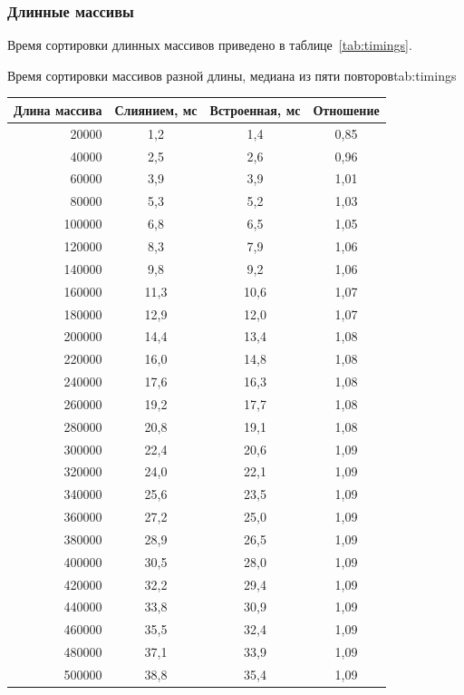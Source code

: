 \documentclass{mtuci-report}
\begin{document}
\subsubsection{Длинные массивы}
Время сортировки длинных массивов приведено в таблице~\ref{tab:timings}.
\begin{bbttable}{Время сортировки массивов разной длины, медиана из пяти
  повторов}{tab:timings}
  \begin{tabular}{|r|c|c|c|}
    \hline
    Длина массива & Слиянием, мс & Встроенная, мс & Отношение \\ \hline
    20000 & 1,2 & 1,4 & 0,85 \\ \hline
    40000 & 2,5 & 2,6 & 0,96 \\ \hline
    60000 & 3,9 & 3,9 & 1,01 \\ \hline
    80000 & 5,3 & 5,2 & 1,03 \\ \hline
    100000 & 6,8 & 6,5 & 1,05 \\ \hline
    120000 & 8,3 & 7,9 & 1,06 \\ \hline
    140000 & 9,8 & 9,2 & 1,06 \\ \hline
    160000 & 11,3 & 10,6 & 1,07 \\ \hline
    180000 & 12,9 & 12,0 & 1,07 \\ \hline
    200000 & 14,4 & 13,4 & 1,08 \\ \hline
    220000 & 16,0 & 14,8 & 1,08 \\ \hline
    240000 & 17,6 & 16,3 & 1,08 \\ \hline
    260000 & 19,2 & 17,7 & 1,08 \\ \hline
    280000 & 20,8 & 19,1 & 1,08 \\ \hline
    300000 & 22,4 & 20,6 & 1,09 \\ \hline
    320000 & 24,0 & 22,1 & 1,09 \\ \hline
    340000 & 25,6 & 23,5 & 1,09 \\ \hline
    360000 & 27,2 & 25,0 & 1,09 \\ \hline
    380000 & 28,9 & 26,5 & 1,09 \\ \hline
    400000 & 30,5 & 28,0 & 1,09 \\ \hline
    420000 & 32,2 & 29,4 & 1,09 \\ \hline
    440000 & 33,8 & 30,9 & 1,09 \\ \hline
    460000 & 35,5 & 32,4 & 1,09 \\ \hline
    480000 & 37,1 & 33,9 & 1,09 \\ \hline
    500000 & 38,8 & 35,4 & 1,09 \\ \hline

\end{tabular}
\end{bbttable}
\end{document}
